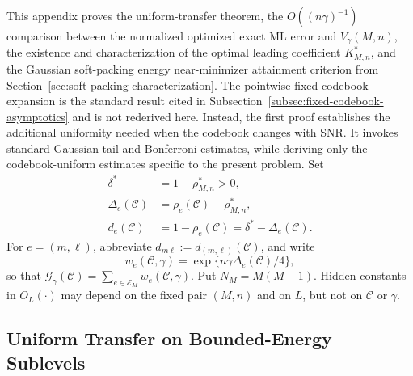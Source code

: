 \documentclass[12pt,draftclsnofoot,onecolumn]{IEEEtran}
\newcommand{\cC}{\mathcal{C}}
\newcommand{\cE}{\mathcal{E}}
\newcommand{\cG}{\mathcal{G}}
\theoremstyle{definition}
\begin{document}
This appendix proves the uniform-transfer theorem, the
\(O((n\gamma)^{-1})\) comparison between the normalized optimized exact ML
error and \(V_\gamma(M,n)\), the existence and characterization of the
optimal leading coefficient \(K^{\ast}_{M,n}\), and the Gaussian soft-packing
energy near-minimizer attainment criterion from
Section~\ref{sec:soft-packing-characterization}.
The pointwise fixed-codebook expansion is the standard result cited in
Subsection~\ref{subsec:fixed-codebook-asymptotics} and is not rederived
here.  Instead, the first proof establishes the additional uniformity
needed when the codebook changes with SNR.  It invokes standard
Gaussian-tail and Bonferroni estimates,
while deriving only the codebook-uniform estimates specific to the
present problem.  Set
\begin{align*}
  \delta^{\ast}&=1-\rho^{\ast}_{M,n}>0,\\
  \Delta_e(\cC)&=\rho_e(\cC)-\rho^{\ast}_{M,n},\\
  d_e(\cC)&=1-\rho_e(\cC)=\delta^{\ast}-\Delta_e(\cC).
\end{align*}
For \(e=(m,\ell)\), abbreviate
\(d_{m\ell}:=d_{(m,\ell)}(\cC)\), and write
\begin{equation*}
  w_e(\cC,\gamma)=\exp\{n\gamma\Delta_e(\cC)/4\},
\end{equation*}
so that \(\cG_\gamma(\cC)=\sum_{e\in\cE_M}w_e(\cC,\gamma)\).
Put \(N_M=M(M-1)\).  Hidden constants in \(O_L(\cdot)\) may depend on
the fixed pair \((M,n)\) and on \(L\), but not on \(\cC\) or \(\gamma\).

\subsection{Uniform Transfer on Bounded-Energy Sublevels}
\end{document}
